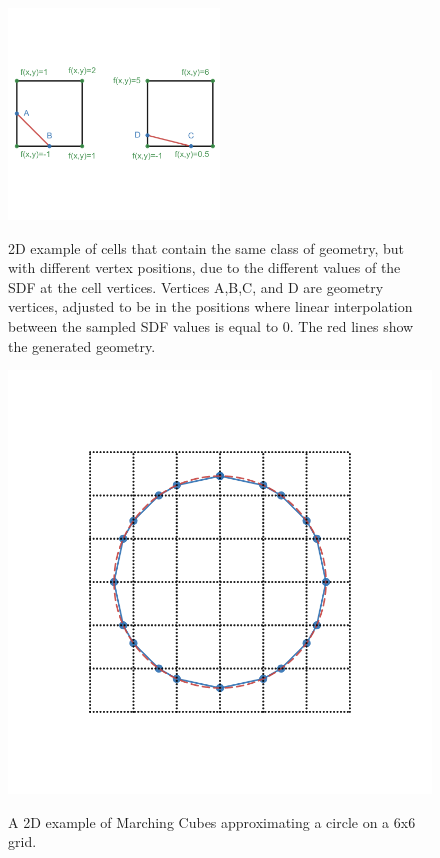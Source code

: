 \documentclass[11pt]{article}
\begin{document}
\begin{figure}
  \caption{2D example of cells that contain the same class of geometry, but with different vertex positions, due to the different values of the SDF at the cell vertices. Vertices A,B,C, and D are geometry vertices, adjusted to be in the positions where linear interpolation between the sampled SDF values is equal to 0. The red lines show the generated geometry.}
  \includegraphics[width=0.5\textwidth]{linear_interpolation.png}
  \label{fig:linear_interpolation}
\end{figure}

\begin{figure}[H]
  \caption{A 2D example of Marching Cubes approximating a circle on a 6x6 grid.}
  \includegraphics[width=\textwidth]{ms_example.png}
  \label{fig:ms_example}
\end{figure}
\end{document}

